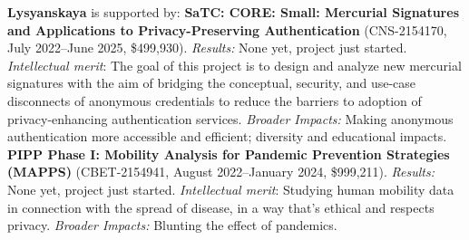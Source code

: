 \noindent\textbf{Lysyanskaya} is supported by:
\textbf{SaTC: CORE: Small: Mercurial Signatures and Applications to Privacy-Preserving Authentication}
(CNS-2154170, July 2022--June 2025, \$499,930).
\textit{Results:} None yet, project just started. \textit{Intellectual merit}:  The goal of this project is to design and analyze new mercurial signatures with the aim of bridging the conceptual, security, and use-case disconnects of anonymous credentials to reduce the barriers to adoption of privacy-enhancing authentication services.
\textit{Broader Impacts:} Making anonymous authentication more accessible and efficient; diversity and educational impacts.  
\textbf{PIPP Phase I: Mobility Analysis for Pandemic Prevention Strategies (MAPPS)}
(CBET-2154941, August 2022--January 2024, \$999,211).
\textit{Results:} None yet, project just started. \textit{Intellectual merit}: Studying human mobility data in connection with the spread of disease, in a way that's ethical and respects privacy.
\textit{Broader Impacts:} Blunting the effect of pandemics.  
